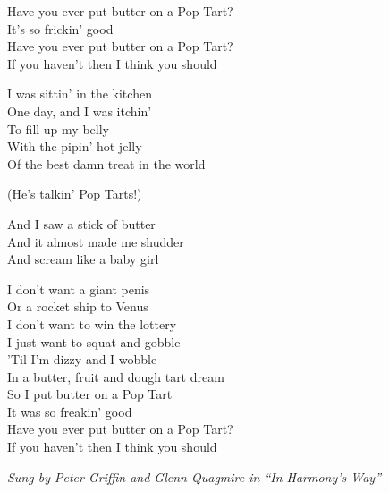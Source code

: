 \vspace{10pt}
Have you ever put butter on a Pop Tart?\\
It's so frickin' good\\
Have you ever put butter on a Pop Tart?\\
If you haven't then I think you should\par
\vspace{10pt}
I was sittin' in the kitchen\\
One day, and I was itchin'\\
To fill up my belly\\
With the pipin' hot jelly\\
Of the best damn treat in the world\par
\vspace{10pt}
(He's talkin' Pop Tarts!)\par
\vspace{10pt}
And I saw a stick of butter\\
And it almost made me shudder\\
And scream like a baby girl\par
\vspace{10pt}
I don't want a giant penis\\
Or a rocket ship to Venus\\
I don't want to win the lottery\\
I just want to squat and gobble\\
'Til I'm dizzy and I wobble\\
In a butter, fruit and dough tart dream\\
So I put butter on a Pop Tart\\
It was so freakin' good\\
Have you ever put butter on a Pop Tart?\\
If you haven't then I think you should\par
\vspace{10pt}
{\footnotesize\textit{Sung by Peter Griffin and Glenn Quagmire in ``In Harmony's Way''}}
